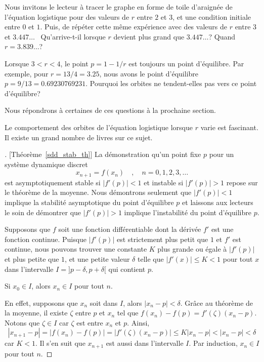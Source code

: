 {\begin{rmk}
Nous invitons le lecteur à tracer le graphe en forme de toile
d'araignée de l'équation logistique pour des valeurs de $r$ entre $2$
et $3$, et une condition initiale entre $0$ et $1$.  Puis, de répéter
cette même expérience avec des valeurs de $r$ entre $3$ et $3.447\ldots$
\ Qu'arrive-t-il lorsque $r$ devient plus grand que $3.447\ldots$?
Quand $r = 3.839\ldots$?

Lorsque $3<r<4$, le point $p=1-1/r$ est toujours un point
d'équilibre.  Par exemple, pour $r=13/4=3.25$, nous avons le point
d'équilibre $p=9/13=0.69230769231$.  Pourquoi les orbites ne
tendent-elles pas vers ce point d'équilibre?

Nous répondrons à certaines de ces questions à la prochaine section.

Le comportement des orbites de l'équation logistique lorsque $r$ varie
est fascinant.   Il existe un grand nombre de livres sur ce sujet.
\end{rmk}

\begin{proof}[\theory][Théorème~\ref{sdd_stab_th}]
La démonstration qu'un point fixe $p$ pour un système dynamique discret
\[
x_{n+1} = f(x_n) \quad , \quad n=0, 1, 2, 3, \ldots
\]
est asymptotiquement stable si $|f'(p)|<1$ et instable si $|f'(p)|>1$
repose sur le théorème de la moyenne.  Nous démontrons seulement que
$|f'(p)|<1$ implique la stabilité asymptotique du point d'équilibre
$p$ et laissons aux lecteurs le soin de démontrer que $|f'(p)|>1$
implique l'instabilité du point d'équilibre $p$.

Supposons que $f$ soit une fonction différentiable dont la dérivée
$f'$ est une fonction continue.  Puisque $|f'(p)|$ est strictement
plus petit que $1$ et $f'$ est continue, nous pouvons trouver une constante
$K$ plus grande ou égale à $|f'(p)|$ et plus petite que $1$, et une
petite valeur $\delta$ telle que $|f'(x)| \leq K<1$ pour tout $x$ dans
l'intervalle $I = ]p-\delta, p+\delta[$ qui contient $p$.

 Si $x_0 \in I$, alors $x_n \in I$ pour tout $n$.

En effet, supposons que $x_n$ soit dans $I$, alors $|x_n-p|<\delta$.  Grâce
au théorème de la moyenne, il existe $\zeta$ entre $p$ et $x_n$ tel que
$f(x_n) - f(p) = f'(\zeta)(x_n - p)$.  Notons que $\zeta \in I$ car $\zeta$
est entre $x_n$ et $p$.  Ainsi,
\[
|x_{n+1} - p| = |f(x_n) - f(p)| = |f'(\zeta)(x_n - p)|
\leq K | x_n - p | < |x_n - p| < \delta
\]
car $K<1$.  Il s'en suit que $x_{n+1}$ est aussi dans l'intervalle $I$.
Par induction, $x_n \in I$ pour tout $n$.


\end{proof}}
